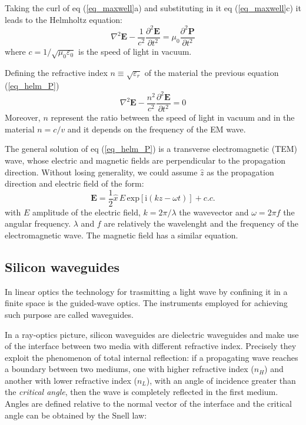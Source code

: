 \documentclass[12pt,a4paper,twoside]{article}
\begin{document}
Taking the curl of eq (\ref{eq_maxwell}a) and substituting in it eq (\ref{eq_maxwell}c) it leads to the Helmholtz equation:
\begin{equation}
\nabla^2 \textbf{E} - \frac{1}{c^2}\frac{\partial^2 \textbf{E}}{\partial t^2} = \mu_0\frac{\partial^2 \textbf{P}}{\partial t^2}
\label{eq_helm_P}
\end{equation}
where $c = 1/\sqrt{\mu_0 \varepsilon_0}$ is the speed of light in vacuum.

Defining the refractive index $n \equiv \sqrt{\varepsilon_r}$ of the material the previous equation (\ref{eq_helm_P})
\begin{equation}
	\nabla^2 \textbf{E} - \frac{n^2}{c^2}\frac{\partial^2 \textbf{E}}{\partial t^2} = 0
	\label{eq_helm_lin}
\end{equation}
Moreover, $n$ represent the ratio between the speed of light in vacuum and in the material $n = c/v$ and it depends on the frequency of the EM wave.

The general solution of eq (\ref{eq_helm_P}) is a transverse electromagnetic (TEM) wave, whose electric and magnetic fields are perpendicular to the propagation direction.
Without losing generality, we could assume $\hat{z}$ as the propagation direction and electric field of the form:
\begin{equation}
	\textbf{E} = \frac{1}{2}\hat{x}\,E\,\mathrm{exp}[\mathrm{i}(kz-\omega t)] + c.c.
	\label{eq_wave}
\end{equation}
with $E$ amplitude of the electric field, $k = 2\pi/\lambda$ the wavevector and $\omega = 2\pi f$ the angular frequency. $\lambda$ and $f$ are relatively the wavelenght and the frequency of the electromagnetic wave.
The magnetic field has a similar equation.

\subsection{Silicon waveguides}
In linear optics the technology for trasmitting a light wave by confining it in a finite space is the guided-wave optics.
The instruments employed for achieving such purpose are called waveguides.

In a ray-optics picture, silicon waveguides are dielectric waveguides and make use of the interface between two media with different refractive index.
Precisely they exploit the phenomenon of total internal reflection: if a propagating wave reaches a boundary between two mediums, one with higher refractive index ($n_H$) and another with lower refractive index ($n_L$), with an angle of incidence greater than the \textit{critical angle}, then the wave is completely reflected in the first medium.
Angles are defined relative to the normal vector of the interface and the critical angle can be obtained by the Snell law:
\end{document}
